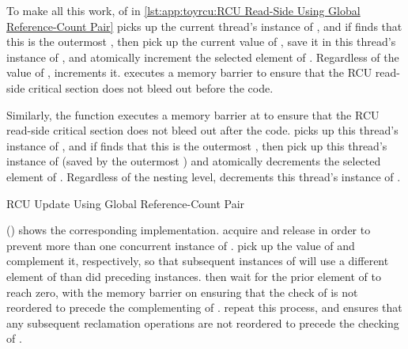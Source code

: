 \begin{lineref}
To make all this work,  of  in
\cref{lst:app:toyrcu:RCU Read-Side Using Global Reference-Count Pair}
picks up the
current thread's instance of , and if  finds
that this is the outermost ,
then  pick up the current value of
, save it in this thread's instance of ,
and atomically increment the selected element of .
Regardless of the value of ,  increments it.
 executes a memory barrier to ensure that the RCU read-side
critical section does not bleed out before the  code.
\end{lineref}

\begin{lineref}
Similarly, the  function executes a memory barrier
at 
to ensure that the RCU read-side critical section does not bleed out
after the  code.
 picks up this thread's instance of , and if
 finds that this is the outermost ,
then  pick up this thread's instance of 
(saved by the outermost ) and atomically decrements
the selected element of .
Regardless of the nesting level,  decrements this thread's
instance of .
\end{lineref}

\begin{listing}[tbp]

\caption{RCU Update Using Global Reference-Count Pair}
\label{lst:app:toyrcu:RCU Update Using Global Reference-Count Pair}
\end{listing}

\begin{lineref}
()
shows the corresponding  implementation.
 acquire and release  in order to
prevent more than one concurrent instance of .
 pick up the value of  and complement it,
respectively, so that subsequent instances of 
will use a different element of  than did preceding
instances.
then wait for the prior element of  to
reach zero, with the memory barrier on  ensuring that the check
of  is not reordered to precede the complementing of
.
 repeat this process, and
 ensures that any
subsequent reclamation operations are not reordered to precede the
checking of .
\end{lineref}

